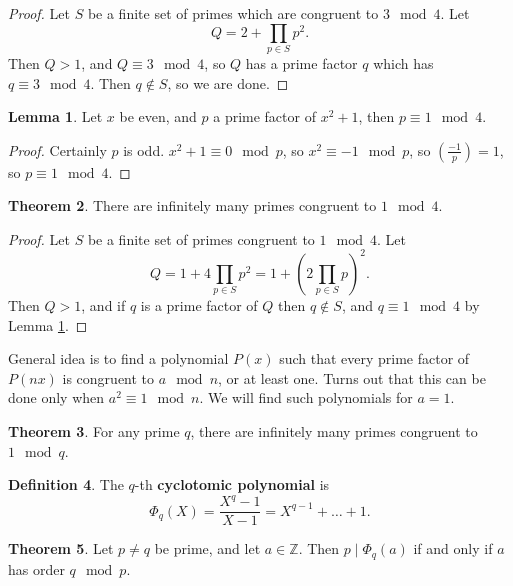 \documentclass{article}
\newcommand{\Z}{\mathbb{Z}}
\newcommand{\rb}[1]{\left( #1 \right)}
\newcommand{\legendre}[2]{\rb{\tfrac{#1}{#2}}}
\theoremstyle{definition}\newtheorem{definition}{Definition}
\theoremstyle{definition}\newtheorem{remark}[definition]{Remark}
\theoremstyle{definition}\newtheorem*{example}{Example}
\theoremstyle{definition}\newtheorem*{note}{Note}
\newtheorem{lemma}[definition]{Lemma}
\newtheorem{theorem}[definition]{Theorem}
\begin{document}
\begin{proof}
Let $ S $ be a finite set of primes which are congruent to $ 3 \mod 4 $. Let
$$ Q = 2 + \prod_{p \in S} p^2. $$
Then $ Q > 1 $, and $ Q \equiv 3 \mod 4 $, so $ Q $ has a prime factor $ q $ which has $ q \equiv 3 \mod 4 $. Then $ q \notin S $, so we are done.
\end{proof}

\begin{lemma}
\label{lem:87}
Let $ x $ be even, and $ p $ a prime factor of $ x^2 + 1 $, then $ p \equiv 1 \mod 4 $.
\end{lemma}

\begin{proof}
Certainly $ p $ is odd. $ x^2 + 1 \equiv 0 \mod p $, so $ x^2 \equiv -1 \mod p $, so $ \legendre{-1}{p} = 1 $, so $ p \equiv 1 \mod 4 $.
\end{proof}

\begin{theorem}
There are infinitely many primes congruent to $ 1 \mod 4 $.
\end{theorem}

\begin{proof}
Let $ S $ be a finite set of primes congruent to $ 1 \mod 4 $. Let
$$ Q = 1 + 4\prod_{p \in S} p^2 = 1 + \rb{2\prod_{p \in S} p}^2. $$
Then $ Q > 1 $, and if $ q $ is a prime factor of $ Q $ then $ q \notin S $, and $ q \equiv 1 \mod 4 $ by Lemma \ref{lem:87}.
\end{proof}

General idea is to find a polynomial $ P\rb{x} $ such that every prime factor of $ P\rb{nx} $ is congruent to $ a \mod n $, or at least one. Turns out that this can be done only when $ a^2 \equiv 1 \mod n $. We will find such polynomials for $ a = 1 $.

\begin{theorem}
For any prime $ q $, there are infinitely many primes congruent to $ 1 \mod q $.
\end{theorem}

\begin{definition}
The $ q $-th \textbf{cyclotomic polynomial} is
$$ \Phi_q\rb{X} = \dfrac{X^q - 1}{X - 1} = X^{q - 1} + \dots + 1. $$
\end{definition}

\begin{theorem}
\label{thm:91}
Let $ p \ne q $ be prime, and let $ a \in \Z $. Then $ p \mid \Phi_q\rb{a} $ if and only if $ a $ has order $ q \mod p $.
\end{theorem}
\end{document}
